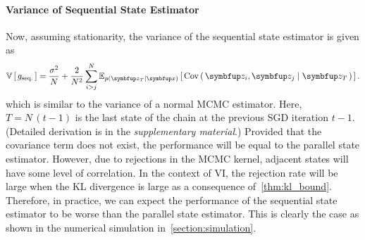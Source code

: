 \paragraph{Variance of Sequential State Estimator}
Now, assuming stationarity, the variance of the sequential state estimator is given as
\begin{align}
  \V{g_{\text{seq.}}} = \frac{\sigma^2}{N} + \frac{2}{N^2} \sum_{i > j}^N \Esub{p\left(\vz_T \mid \vx \right)}{ \Cov{ \vz_{i}, \vz_{j} \mid \vz_{T} } }\label{eq:var_seq}.
\end{align}
which is similar to the variance of a normal MCMC estimator.
Here, \(T = N\,\left(t - 1\right)\) is the last state of the chain at the previous SGD iteration \(t-1\).
(Detailed derivation is in the \textit{supplementary material}.)
Provided that the covariance term does not exist, the performance will be equal to the parallel state estimator.
However, due to rejections in the MCMC kernel, adjacent states will have some level of correlation.
In the context of VI, the rejection rate will be large when the KL divergence is large as a consequence of~\cref{thm:kl_bound}.
Therefore, in practice, we can expect the performance of the sequential state estimator to be worse than the parallel state estimator.
This is clearly the case as shown in the numerical simulation in~\cref{section:simulation}.

%
%
%

%

